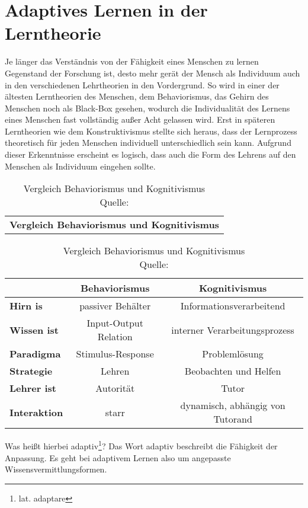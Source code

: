 \chapter{Adaptives Lernen in der Lerntheorie}
Je länger das Verständnis von der Fähigkeit eines Menschen zu lernen Gegenstand der Forschung ist,
desto mehr gerät der Mensch als Individuum auch in den verschiedenen Lehrtheorien in den Vordergrund.
So wird in einer der ältesten Lerntheorien des Menschen, dem Behaviorismus, das Gehirn des Menschen noch als
Black-Box gesehen, wodurch die Individualität des Lernens eines Menschen fast vollständig außer Acht gelassen wird.
Erst in späteren Lerntheorien wie dem Konstruktivismus stellte sich heraus, dass der Lernprozess
theoretisch für jeden Menschen individuell unterschiedlich sein kann.
Aufgrund dieser Erkenntnisse erscheint es logisch, dass auch die Form des Lehrens auf den Menschen als Individuum eingehen sollte.

\begin{table}[!htbp]
	\centering
	\begin{tabular}{c}
		\textbf{Vergleich Behaviorismus und Kognitivismus}
	\end{tabular}

	\begin{tabular}{m{3cm} || c | c}
		\hline
		\  & \textbf{Behaviorismus} & \textbf{Kognitivismus} \\
		\hline
		\textbf{Hirn is} & passiver Behälter & Informationsverarbeitend \\
		\textbf{Wissen ist} & Input-Output Relation & interner Verarbeitungsprozess \\
		\textbf{Paradigma} & Stimulus-Response & Problemlösung  \\
		\textbf{Strategie} & Lehren & Beobachten und Helfen \\
		\textbf{Lehrer ist} & Autorität & Tutor \\
		\textbf{Interaktion} & starr & dynamisch, abhängig von Tutorand \\
	\end{tabular}

	\caption[Vergleich Behaviorismus und Kognitivismus]{Vergleich Behaviorismus und Kognitivismus \\ Quelle: \cite[S. 110, S. 174]{baumgartner1994}}
  \label{tab:behaviorismus_kognitivismus}
\end{table}

Was heißt hierbei adaptiv\footnote{lat. adaptare}?
Das Wort adaptiv beschreibt die Fähigkeit der Anpassung.
Es geht bei adaptivem Lernen also um angepasste Wissensvermittlungsformen.

